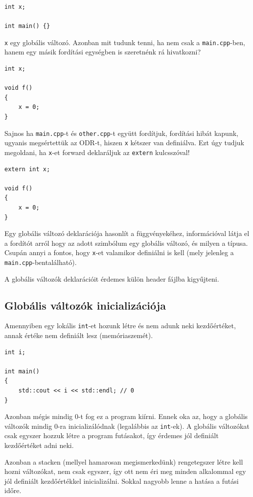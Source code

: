 \documentclass[a4paper,11.5pt,table]{article}
\begin{document}
	\begin{lstlisting}
int x;

int main() {}
	\end{lstlisting}
	\texttt{x} egy globális változó. Azonban mit tudunk tenni, ha nem csak a \texttt{main.cpp}-ben, hanem egy másik fordítási egységben is szeretnénk rá hivatkozni?
	\medskip
	
	\begin{lstlisting}
int x;

void f() 
{
	x = 0;
}
	\end{lstlisting}
  Sajnos ha \texttt{main.cpp}-t és \texttt{other.cpp}-t együtt fordítjuk, fordítási hibát kapunk, ugyanis megsértettük az ODR-t, hiszen \texttt{x} kétszer van definiálva. Ezt úgy tudjuk megoldani, ha \texttt{x}-et forward deklaráljuk az \texttt{extern} kulcsszóval!
	\medskip
	
	\begin{lstlisting}
extern int x;

void f() 
{
	x = 0;
}
	\end{lstlisting}
	Egy globális változó deklarációja hasonlít a függvényekéhez, információval látja el a fordítót arról hogy az adott szimbólum egy globális változó, és milyen a típusa. Csupán annyi a fontos, hogy \texttt{x}-et valamikor definiálni is kell (mely jelenleg a \texttt{main.cpp}-bentalálható).
	\begin{note}
		A globális változók deklarációit érdemes külön header fájlba kigyűjteni.
	\end{note}
	\subsection{Globális változók inicializációja}
	Amennyiben egy lokális \texttt{int}-et hozunk létre és nem adunk neki kezdőértéket, annak értéke nem definiált lesz (memóriaszemét).
	\begin{lstlisting}
int i;

int main() 
{
	std::cout << i << std::endl; // 0
}
	\end{lstlisting}   
	Azonban mégis mindig 0-t fog ez a program kiírni. Ennek oka az, hogy a globális változók mindig 0-ra inicializálódnak (legalábbis az \texttt{int}-ek). A globális változókat csak egyszer hozzuk létre a program futásakot, így érdemes jól definiált kezdőértéket adni neki.
	
	Azonban a stacken (mellyel hamarosan megismerkedünk) rengetegszer létre kell hozni változókat, nem csak egyszer, így ott nem éri meg minden alkalommal egy jól definiált kezdőértékkel inicializálni. Sokkal nagyobb lenne a hatása a futási időre.
	
\end{document}

